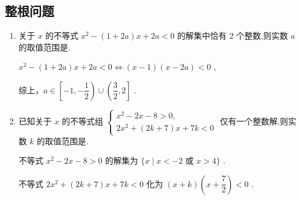 \subsection*{整根问题}
\begin{enumerate}
    \item 关于 $x$ 的不等式 ${x}^{2} - \left( {1 + {2a}}\right) x + {2a} < 0$ 的解集中恰有 2 个整数,则实数 $a$ 的取值范围是.
    \begin{jieda}
        ${x}^{2} - \left( {1 + {2a}}\right) x + {2a} < 0 \Longleftrightarrow \left( {x - 1}\right) \left( {x - {2a}}\right)  < 0$ ,

        综上，$a \in \left\lbrack  {-1, - \dfrac{1}{2}}\right)  \cup  \left( {\dfrac{3}{2},2}\right\rbrack$ .
    \end{jieda}
    \item 已知关于 $x$ 的不等式组 $\left\{  \begin{array}{l} {x}^{2} - {2x} - 8 > 0, \\  2{x}^{2} + \left( {{2k} + 7}\right) x + {7k} < 0 \end{array}\right.$ 仅有一个整数解,则实数 $k$ 的取值范围是\blkda[2]{$ [-5, 3) \cup (4,5]$}.
    \begin{jieda}
        不等式 ${x}^{2} - {2x} - 8 > 0$ 的解集为 $\{ x \mid  x <  - 2$ 或 $x > 4\}$ .
        
        不等式 $2{x}^{2} + \left( {{2k} + 7}\right) x + {7k} < 0$ 化为 $\left( {x + k}\right) \left( {x + \dfrac{7}{2}}\right)  < 0$ .

\end{jieda}
\end{enumerate}

